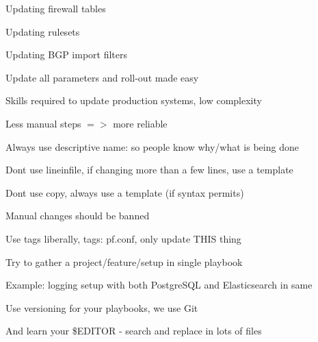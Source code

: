 \documentclass[17pt,Screen16to9,footrule]{foils}
\begin{document}
\begin{list1}
\item Updating firewall tables
\item Updating rulesets
\item Updating BGP import filters
\item Update all parameters and roll-out made easy
\item Skills required to update production systems, low complexity
\item Less manual steps $=>$ more reliable
\end{list1}


\begin{list1}
\item Always use descriptive name: so people know why/what is being done
\item Dont use lineinfile, if changing more than a few lines, use a template
\item Dont use copy, always use a template (if syntax permits)
\item Manual changes should be banned
\item Use tags liberally, tags: pf.conf, only update THIS thing
\item Try to gather a project/feature/setup in single playbook
\item Example: logging setup with both PostgreSQL and Elasticsearch in same
\item Use versioning for your playbooks, we use Git
\end{list1}

\vskip 1cm

\centerline{\hlkbig And learn your \$EDITOR - search and replace in lots of files \smiley }

\myquestionspage
\end{document}
